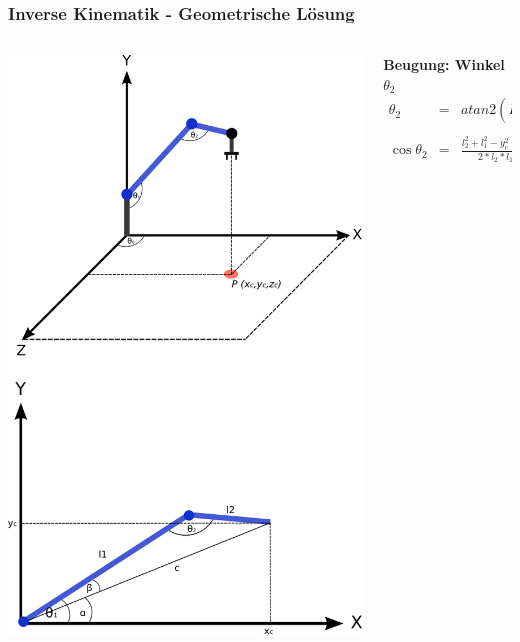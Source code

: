 \begin{frame}
\frametitle{Inverse Kinematik - Geometrische Lösung}
\begin{columns}
\begin{column}{.32\textwidth}
\includegraphics[scale=0.2]{imgs/inverseKinematik.png}
\end{column}%
\hfill
\begin{column}{.72\textwidth}
\textbf{Beugung: Winkel $\theta_2$}
\small \begin{eqnarray*}
\theta_2 &=& atan2(D, \pm \sqrt{1-D^2}) \\ \\
\cos \theta_2 &=& \frac{l_2^2 + l_1^2 - y_c^2 - z_c^2}{2*l_2*l_1} :=D
\end{eqnarray*}
\end{column}
\end{columns}
\end{frame}

